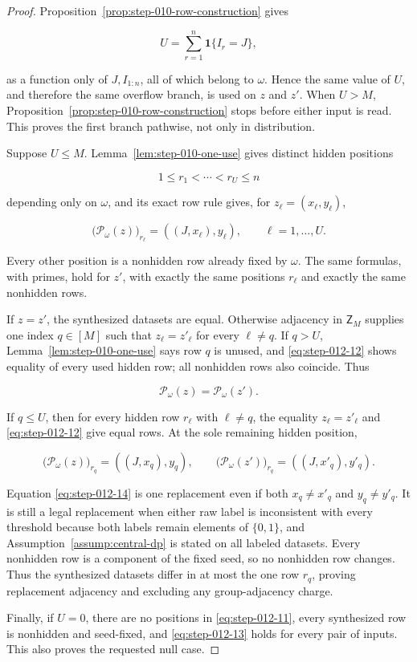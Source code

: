 \begin{proof}
Proposition~\ref{prop:step-010-row-construction} gives

\[
  U=\sum_{r=1}^n\mathbf1\{I_r=J\},
\tag{S12.10}\label{eq:step-012-10}
\]

as a function only of \(J,I_{1:n}\), all of which belong to \(\omega\).
Hence the same value of \(U\), and therefore the same overflow branch, is
used on \(z\) and \(z'\).  When \(U>M\), Proposition~\ref{prop:step-010-row-construction} stops before either input
is read.  This proves the first branch pathwise, not only in distribution.

Suppose \(U\le M\).  Lemma~\ref{lem:step-010-one-use} gives distinct
hidden positions

\[
  1\le r_1<\cdots<r_U\le n
\tag{S12.11}\label{eq:step-012-11}
\]

depending only on \(\omega\), and its exact row rule gives, for
\(z_\ell=(x_\ell,y_\ell)\),

\[
  \bigl(\mathcal P_\omega(z)\bigr)_{r_\ell}
  =((J,x_\ell),y_\ell),
  \qquad \ell=1,\ldots,U.
\tag{S12.12}\label{eq:step-012-12}
\]

Every other position is a nonhidden row already fixed by \(\omega\).
The same formulas, with primes, hold for \(z'\), with exactly the same
positions \(r_\ell\) and exactly the same nonhidden rows.

If \(z=z'\), the synthesized datasets are equal.  Otherwise adjacency in
\(\mathsf Z_M\) supplies one index \(q\in[M]\) such that
\(z_\ell=z'_\ell\) for every \(\ell\ne q\).  If \(q>U\), Lemma~\ref{lem:step-010-one-use} says row \(q\) is unused, and \eqref{eq:step-012-12}
shows equality of every used hidden row; all nonhidden rows also coincide.
Thus

\[
  \mathcal P_\omega(z)=\mathcal P_\omega(z').
\tag{S12.13}\label{eq:step-012-13}
\]

If \(q\le U\), then for every hidden row \(r_\ell\) with \(\ell\ne q\),
the equality \(z_\ell=z'_\ell\) and \eqref{eq:step-012-12} give equal rows.  At the sole
remaining hidden position,

\[
  \bigl(\mathcal P_\omega(z)\bigr)_{r_q}=((J,x_q),y_q),
  \qquad
  \bigl(\mathcal P_\omega(z')\bigr)_{r_q}=((J,x'_q),y'_q).
\tag{S12.14}\label{eq:step-012-14}
\]

Equation \eqref{eq:step-012-14} is one replacement even if both \(x_q\ne x'_q\) and
\(y_q\ne y'_q\).  It is still a legal replacement when either raw label
is inconsistent with every threshold because both labels remain elements
of \(\{0,1\}\), and Assumption~\ref{assump:central-dp} is stated on all
labeled datasets.  Every nonhidden row is a component of the fixed seed,
so no nonhidden row changes.  Thus the synthesized datasets differ in at
most the one row \(r_q\), proving replacement adjacency and excluding any
group-adjacency charge.

Finally, if \(U=0\), there are no positions in \eqref{eq:step-012-11}, every synthesized
row is nonhidden and seed-fixed, and \eqref{eq:step-012-13} holds for every pair of inputs.
This also proves the requested null case. \end{proof}

